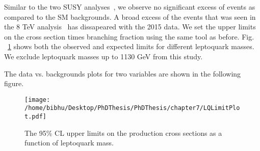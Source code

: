 Similar to the two SUSY analyses~\cite{CMS-PAS-SUS-15-002,CMS-PAS-SUS-16-014}, we observe no significant excess of events as compared to the SM backgrounds. A broad excess of the events that was seen in the 8 TeV analysis~\cite{CMS-PAS-EXO-12-041} has dissapeared with the 2015 data. We set the upper limits on the cross section times branching fraction using the same tool as before. Fig. ~\ref{figure:LimitLQ12016} shows both the observed and expected limits for different leptoquark masses. We exclude leptoquark masses up to 1130 GeV from this study. 


The data vs. backgrounds plots for two variables are shown in the following figure.



\begin{figure}[h]
\centering
\texttt{[image: /home/bibhu/Desktop/PhDThesis/PhDThesis/chapter7/LQLimitPlot.pdf]}

\caption{\label{figure:LimitLQ12016}The 95\% CL upper limits on the production cross sections as a function of leptoquark mass.}
\end{figure}











